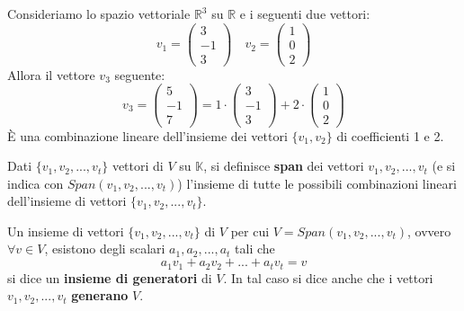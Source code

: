 \begin{example}
	Consideriamo lo spazio vettoriale $\mathbb{R}^3$ su $\mathbb{R}$ e i seguenti
	due vettori:
	\begin{equation*}
		v_1 = \begin{pmatrix}
			3 \\ -1 \\ 3
		\end{pmatrix}
		\quad
		v_2 = \begin{pmatrix}
			1 \\ 0 \\ 2
		\end{pmatrix}
	\end{equation*}
	Allora il vettore $v_3$ seguente:
	\begin{equation*}
		v_3 = \begin{pmatrix}
			5 \\ -1 \\ 7
		\end{pmatrix}
		= 1 \cdot \begin{pmatrix}
			3 \\ -1 \\ 3
		\end{pmatrix}
		+ 2 \cdot \begin{pmatrix}
			1 \\ 0 \\ 2
		\end{pmatrix}
	\end{equation*}
	\`E una combinazione lineare dell'insieme dei vettori $\{v_1, v_2\}$ di
	coefficienti 1 e 2.
\end{example}

\begin{defn}
	Dati $\{v_1, v_2, ..., v_t\}$ vettori di $V$ su $\mathbb{K}$,
	si definisce \textbf{span} dei vettori $v_1, v_2, ..., v_t$
	(e si indica con $Span(v_1, v_2, ..., v_t)$) l'insieme di tutte
	le possibili combinazioni lineari dell'insieme di vettori
	$\{v_1, v_2, ..., v_t\}$.
\end{defn}

\begin{defn}
	Un insieme di vettori $\{v_1, v_2, ..., v_t\}$ di $V$ per cui
	$V = Span(v_1, v_2, ..., v_t)$, ovvero $\forall v \in V$, esistono
	degli scalari $a_1, a_2, ..., a_t$ tali che
	\begin{equation*}
		a_1 v_1 + a_2 v_2 + ... + a_t v_t = v
	\end{equation*}
	si dice un \textbf{insieme di generatori} di $V$. In tal caso si dice
	anche che i vettori $v_1, v_2, ..., v_t$ \textbf{generano} $V$.
\end{defn}

